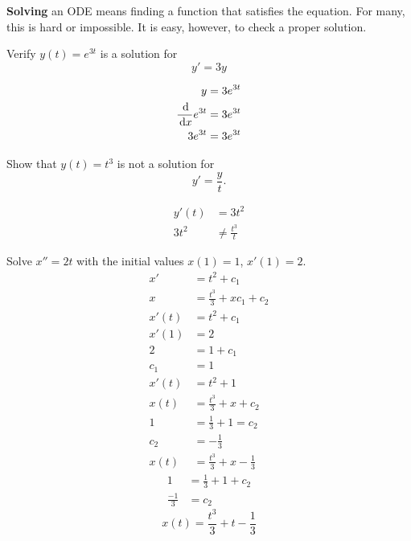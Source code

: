 \textbf{Solving} an ODE means finding a function that satisfies the equation.
For many, this is hard or impossible.
It is easy, however, to check a proper solution.
\begin{ex}
  Verify $y(t)=e^{3t}$ is a solution for
  \[ y'=3y \]
  \begin{sol}
    \begin{align*}
      y&=3e^{3t} \\
      \frac{\,\mathrm{d}}{\,\mathrm{d} x} e^{3t} &=3e^{3t} \\
      3e^{3t} &= 3e^{3t}
    \end{align*}
  \end{sol}
\end{ex}
\begin{ex}
  Show that $y(t)=t^3$ is not a solution for \[y'=\frac{y}{t}.\]
  \begin{sol}
    \begin{align*}
      y'(t)&=3t^2 \\
      3t^2 &\neq \frac{t^3}{t}
    \end{align*}
  \end{sol}
\end{ex}
\begin{ex}
  Solve $x''=2t$ with the initial values $x(1)=1$, $x'(1)=2$.
  \begin{align*}
    x'&= t^2 +c_1 \\
    x&= \frac{t^3}{3} +xc_1+c_2 \\
    x'(t) &= t^2 + c_1 \\
    x'(1) &=2 \\
    2&= 1+c_1 \\
    c_1 &=1 \\
    x'(t) &= t^2 + 1 \\
    x(t) &= \frac{t^3}{3}+x+c_2 \\
    1 &= \frac{1}{3}+1=c_2 \\
    c_2 &= -\frac{1}{3} \\
    x(t) &= \frac{t^3}{3}+x-\frac{1}{3}
  \end{align*}
  \begin{align*}
    1&=\frac{1}{3}+1+c_2 \\
    \frac{-1}{3} &= c_2
  \end{align*}
  \[ x(t) = \frac{t^3}{3}+t-\frac{1}{3} \]
\end{ex}

